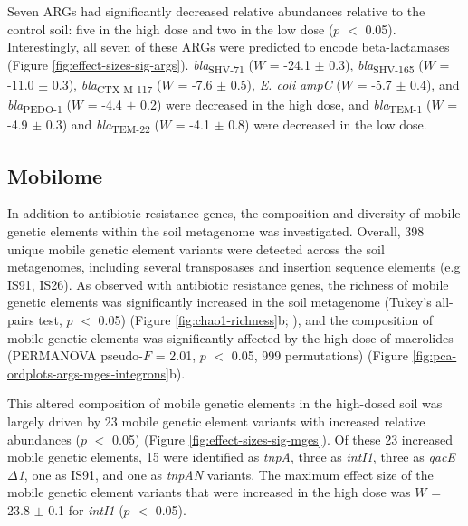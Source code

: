 Seven ARGs had significantly decreased relative abundances relative to the control soil: five in the high dose and two in the low dose ($p$ $<$ 0.05).
Interestingly, all seven of these ARGs were predicted to encode beta-lactamases (Figure \ref{fig:effect-sizes-sig-args}).
\textit{bla}\textsubscript{SHV-71} ($W$ = -24.1 $\pm$ 0.3), \textit{bla}\textsubscript{SHV-165} ($W$ = -11.0 $\pm$ 0.3), \textit{bla}\textsubscript{CTX-M-117} ($W$ = -7.6 $\pm$ 0.5), \textit{E. coli} \textit{ampC} ($W$ = -5.7 $\pm$ 0.4), and \textit{bla}\textsubscript{PEDO-1} ($W$ = -4.4 $\pm$ 0.2) were decreased in the high dose, and \textit{bla}\textsubscript{TEM-1} ($W$ = -4.9 $\pm$ 0.3) and \textit{bla}\textsubscript{TEM-22} ($W$ = -4.1 $\pm$ 0.8) were decreased in the low dose.

\subsection{Mobilome}

In addition to antibiotic resistance genes, the composition and diversity of mobile genetic elements within the soil metagenome was investigated.
Overall, 398 unique mobile genetic element variants were detected across the soil metagenomes, including several transposases and insertion sequence elements (e.g IS91, IS26).
As observed with antibiotic resistance genes, the richness of mobile genetic elements was significantly increased in the soil metagenome (Tukey’s all-pairs test, $p$ $<$ 0.05) (Figure \ref{fig:chao1-richness}b; \dummyfig), and the composition of mobile genetic elements was significantly affected by the high dose of macrolides (PERMANOVA pseudo-$F$ = 2.01, $p$ $<$ 0.05, 999 permutations) (Figure \ref{fig:pca-ordplots-args-mges-integrons}b).

This altered composition of mobile genetic elements in the high-dosed soil was largely driven by 23 mobile genetic element variants with increased relative abundances ($p$ $<$ 0.05) (Figure \ref{fig:effect-sizes-sig-mges}).
Of these 23 increased mobile genetic elements, 15 were identified as \textit{tnpA}, three as \textit{intI1}, three as \textit{qacE$\Delta$1}, one as IS91, and one as \textit{tnpAN} variants.
The maximum effect size of the mobile genetic element variants that were increased in the high dose was $W$ = 23.8 $\pm$ 0.1 for \textit{intI1} ($p$ $<$ 0.05).

